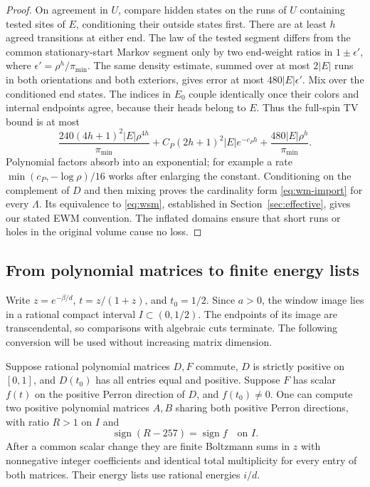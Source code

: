 \begin{proof}
On agreement in \(U\), compare hidden states on the runs of \(U\) containing tested sites of \(E\), conditioning their outside states first. There are at least \(h\) agreed transitions at either end. The law of the tested segment differs from the common stationary-start Markov segment only by two end-weight ratios in \(1\pm\epsilon'\), where \(\epsilon'=\rho^h/\pi_{\min}\). The same density estimate, summed over at most \(2|E|\) runs in both orientations and both exteriors, gives error at most \(480|E|\epsilon'\). Mix over the conditioned end states. The indices in \(E_0\) couple identically once their colors and internal endpoints agree, because their heads belong to \(E\). Thus the full-spin TV bound is at most
\begin{equation}\label{eq:line-mixing-bound}
\frac{240(4h+1)^2|E|\rho^{4h}}{\pi_{\min}}
+C_P(2h+1)^2|E|e^{-c_Ph}
+\frac{480|E|\rho^h}{\pi_{\min}}.
\end{equation}
Polynomial factors absorb into an exponential; for example a rate
\(\min(c_P,-\log\rho)/16\) works after enlarging the constant. Conditioning on the complement of \(D\) and then mixing proves the cardinality form \eqref{eq:wm-import} for every \(\Lambda\). Its equivalence to \eqref{eq:wsm}, established in Section~\ref{sec:effective}, gives our stated EWM convention. The inflated domains ensure that short runs or holes in the original volume cause no loss.
\end{proof}

\subsection{From polynomial matrices to finite energy lists}\label{sec:lists}

Write \(z=e^{-\beta/d}\), \(t=z/(1+z)\), and \(t_0=1/2\). Since \(a>0\), the window image lies in a rational compact interval \(I\subset(0,1/2)\). The endpoints of its image are transcendental, so comparisons with algebraic cuts terminate. The following conversion will be used without increasing matrix dimension.

\begin{lemma}\label{lem:matrix-conversion}
Suppose rational polynomial matrices \(D,F\) commute, \(D\) is strictly positive on \([0,1]\), and \(D(t_0)\) has all entries equal and positive. Suppose \(F\) has scalar \(f(t)\) on the positive Perron direction of \(D\), and \(f(t_0)\ne0\). One can compute two positive polynomial matrices \(A,B\) sharing both positive Perron directions, with ratio \(R>1\) on \(I\) and
\[
\operatorname{sign}(R-257)=\operatorname{sign}f\quad\text{on }I.
\]
After a common scalar change they are finite Boltzmann sums in \(z\) with nonnegative integer coefficients and identical total multiplicity for every entry of both matrices. Their energy lists use rational energies \(i/d\).
\end{lemma}

